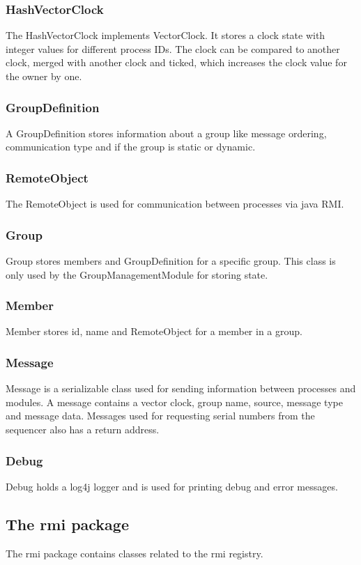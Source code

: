 \documentclass[english]{article}
\begin{document}
\subsubsection{HashVectorClock}
The HashVectorClock implements VectorClock. It stores a clock state with integer values for different process IDs. The clock can be compared to another clock, merged with another clock and ticked, which increases the clock value for the owner by one.

\subsubsection{GroupDefinition}
A GroupDefinition stores information about a group like message ordering, communication type and if the group is static or dynamic. 

\subsubsection{RemoteObject}
The RemoteObject is used for communication between processes via java RMI. 

\subsubsection{Group}
Group stores members and GroupDefinition for a specific group. This class is only used by the GroupManagementModule for storing state.

\subsubsection{Member}
Member stores id, name and RemoteObject for a member in a group.

\subsubsection{Message}
Message is a serializable class used for sending information between processes and modules. A message contains a vector clock, group name, source, message type and message data. Messages used for requesting serial numbers from the sequencer also has a return address.

\subsubsection{Debug}
Debug holds a log4j logger and is used for printing debug and error messages.

\subsection{The rmi package}
The rmi package contains classes related to the rmi registry. 
\end{document}
